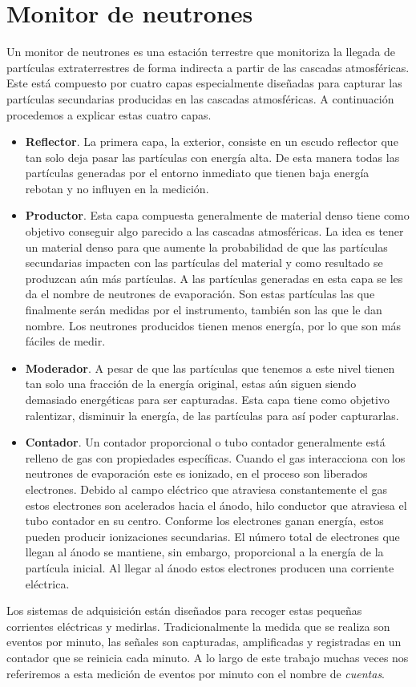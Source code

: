 \section{Monitor de neutrones}
	Un monitor de neutrones es una estación terrestre que monitoriza la llegada de partículas extraterrestres de forma indirecta a partir de las
	cascadas atmosféricas. Este está compuesto por cuatro capas especialmente diseñadas para capturar las partículas secundarias producidas en las
	cascadas atmosféricas. A continuación procedemos a explicar estas cuatro capas.
	\begin{itemize}
		\item	\textbf{Reflector}. La primera capa, la exterior, consiste en un escudo reflector que tan solo deja pasar las partículas con
			energía alta.  De esta manera todas las partículas generadas por el entorno inmediato que tienen baja energía rebotan y no
			influyen en la medición.
		\item	\textbf{Productor}. Esta capa compuesta generalmente de material denso tiene como objetivo conseguir algo parecido a las
			cascadas atmosféricas. La idea es tener un material denso para que aumente la probabilidad de que las partículas secundarias
			impacten con las partículas del material y como resultado se produzcan aún más partículas. A las partículas generadas en esta
			capa se les da el nombre de neutrones de evaporación. Son estas partículas las que finalmente serán medidas por el
			instrumento, también son las que le dan nombre. Los neutrones producidos tienen menos energía, por lo que son más fáciles de
			medir.
		\item	\textbf{Moderador}. A pesar de que las partículas que tenemos a este nivel tienen tan solo una fracción de la energía
			original, estas aún siguen siendo demasiado energéticas para ser capturadas. Esta capa tiene como objetivo ralentizar,
			disminuir la energía, de las partículas para así poder capturarlas.
		\item	\textbf{Contador}. Un contador proporcional o tubo contador generalmente está relleno de gas con propiedades específicas.
			Cuando el gas interacciona con los neutrones de evaporación este es ionizado, en el proceso son liberados electrones. Debido
			al campo eléctrico que atraviesa constantemente el gas estos electrones son acelerados hacia el ánodo, hilo conductor que
			atraviesa el tubo contador en su centro. Conforme los electrones ganan energía, estos pueden producir ionizaciones
			secundarias. El número total de electrones que llegan al ánodo se mantiene, sin embargo, proporcional a la energía de la
			partícula inicial. Al llegar al ánodo estos electrones producen una corriente eléctrica. 

	\end{itemize}
	\par
	Los sistemas de adquisición están diseñados para recoger estas pequeñas corrientes eléctricas y medirlas. Tradicionalmente la medida que se
	realiza son eventos por minuto, las señales son capturadas, amplificadas y registradas en un contador que se reinicia cada minuto. A lo largo
	de este trabajo muchas veces nos referiremos a esta medición de eventos por minuto con el nombre de \emph{cuentas}. 

